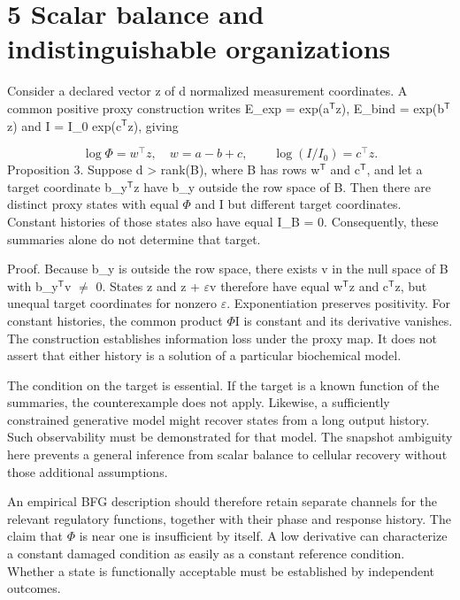 \documentclass[11pt,a4paper]{article}
\begin{document}
\section*{5 Scalar balance and indistinguishable organizations}
Consider a declared vector z of d normalized measurement coordinates. A common positive proxy construction writes E\_exp = exp(a$^{\mathsf T}$z), E\_bind = exp(b$^{\mathsf T}$z) and I = I\_0 exp(c$^{\mathsf T}$z), giving

\begin{equation}\log\Phi=w^\top z,\quad w=a-b+c,\qquad \log(I/I_0)=c^\top z.\tag{6}\end{equation}
Proposition 3. Suppose d > rank(B), where B has rows w$^{\mathsf T}$ and c$^{\mathsf T}$, and let a target coordinate b\_y$^{\mathsf T}$z have b\_y outside the row space of B. Then there are distinct proxy states with equal $\Phi$ and I but different target coordinates. Constant histories of those states also have equal I\_B = 0. Consequently, these summaries alone do not determine that target.

Proof. Because b\_y is outside the row space, there exists v in the null space of B with b\_y$^{\mathsf T}$v $\ne$ 0. States z and z + $\varepsilon$v therefore have equal w$^{\mathsf T}$z and c$^{\mathsf T}$z, but unequal target coordinates for nonzero $\varepsilon$. Exponentiation preserves positivity. For constant histories, the common product $\Phi$I is constant and its derivative vanishes. The construction establishes information loss under the proxy map. It does not assert that either history is a solution of a particular biochemical model.

The condition on the target is essential. If the target is a known function of the summaries, the counterexample does not apply. Likewise, a sufficiently constrained generative model might recover states from a long output history. Such observability must be demonstrated for that model. The snapshot ambiguity here prevents a general inference from scalar balance to cellular recovery without those additional assumptions.

An empirical BFG description should therefore retain separate channels for the relevant regulatory functions, together with their phase and response history. The claim that $\Phi$ is near one is insufficient by itself. A low derivative can characterize a constant damaged condition as easily as a constant reference condition. Whether a state is functionally acceptable must be established by independent outcomes.
\end{document}
